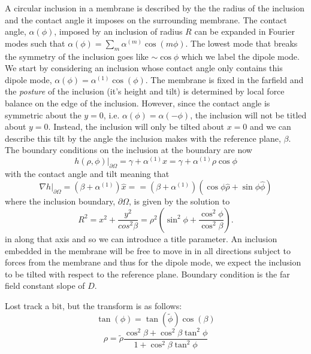 {A circular inclusion in a membrane is described by the the radius of the inclusion and the contact angle it imposes on the surrounding membrane. The contact angle, $\alpha(\phi)$, imposed by an inclusion of radius $R$ can be expanded in Fourier modes such that $\alpha(\phi) = \sum_{m}\alpha^{(m)}\cos(m\phi)$. The lowest mode that breaks the symmetry of the inclusion goes like $\sim \cos\phi$ which we label the dipole mode. We start by considering an inclusion whose contact angle only contains this dipole mode, $\alpha(\phi) = \alpha^{(1)}\cos(\phi)$. The membrane is fixed in the farfield and the \textit{posture} of the inclusion (it's height and tilt) is determined by local force balance on the edge of the inclusion. However, since the contact angle is symmetric about the $y=0$, i.e. $\alpha(\phi) = \alpha(-\phi)$, the inclusion will not be titled about $y=0$. Instead, the inclusion will only be tilted about $x=0$ and we can describe this tilt by the angle the inclusion makes with the reference plane, $\beta$. The boundary conditions on the inclusion at the boundary are now
\begin{equation}
    h(\rho, \phi)|_{\partial \Omega} = \gamma + \alpha^{(1)}x = \gamma + \alpha^{(1)}\rho\cos\phi
\end{equation}
with the contact angle and tilt meaning that
\begin{equation}
    \nabla h|_{\partial \Omega} = (\beta + \alpha^{(1)})\hat{x} = =(\beta + \alpha^{(1)})(\cos\phi\hat{\rho}+\sin\phi\hat{\phi})
\end{equation}
where the inclusion boundary, $\partial\Omega$, is given by the solution to
\begin{equation}
    R^2 = x^2 + \frac{y^2}{cos^2\beta} = \rho^2\left(\sin^2\phi+\frac{\cos^2\phi}{\cos^2\beta}\right).
\end{equation}
in along that axis and so we can introduce a title parameter. An inclusion embedded in the membrane will be free to move in in all directions subject to forces from the membrane and thus for the dipole mode, we expect the inclusion to be tilted with respect to the reference plane. Boundary condition is the far field constant slope of $D$.

Lost track a bit, but the transform is as follows:
\begin{equation}
    \tan(\phi) = \tan(\tilde{\phi})\cos(\beta)
\end{equation}
\begin{equation}
    \rho = \tilde{\rho}\frac{\cos^2\beta+\cos^2\beta\tan^2\phi}{1+\cos^2\beta\tan^2\phi}
\end{equation}

}
